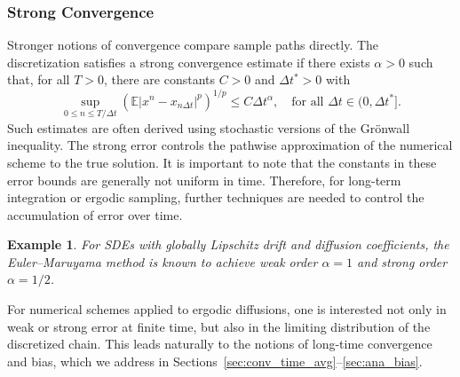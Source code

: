 \documentclass[11pt, twoside]{report}
\newtheorem{example}[theorem]{Example}
\begin{document}
\subsubsection{Strong Convergence}

Stronger notions of convergence compare sample paths directly. The discretization satisfies a strong convergence estimate if there exists $\alpha > 0$ such that, for all $T > 0$, there are constants $C > 0$ and $\Delta t^* > 0$ with
\[
\sup_{0 \leq n \leq T/\Delta t} \left( \mathbb{E} \left| x^n - x_{n\Delta t} \right|^p \right)^{1/p} \leq C \Delta t^\alpha,
\quad \text{for all } \Delta t \in (0, \Delta t^*].
\]
Such estimates are often derived using stochastic versions of the Gr\"{o}nwall inequality. The strong error controls the pathwise approximation of the numerical scheme to the true solution.
It is important to note that the constants in these error bounds are generally not uniform in time. Therefore, for long-term integration or ergodic sampling, further techniques are needed to control the accumulation of error over time.

\begin{example}
    For SDEs with globally Lipschitz drift and diffusion coefficients, the Euler–Maruyama method is known to achieve weak order $\alpha = 1$ and strong order $\alpha = 1/2$. 
\end{example}
For numerical schemes applied to ergodic diffusions, one is interested not only in weak or strong error at finite time, but also in the limiting distribution of the discretized chain. This leads naturally to the notions of long-time convergence and bias, which we address in Sections~\ref{sec:conv_time_avg}--\ref{sec:ana_bias}.
\end{document}
